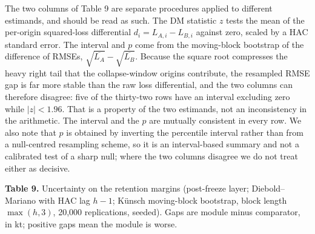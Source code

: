 \documentclass[11pt]{article}
\begin{document}
The two columns of Table 9 are separate procedures applied to different
estimands, and should be read as such. The DM statistic \(z\) tests the
mean of the per-origin squared-loss differential
\(d_i = L_{A,i} - L_{B,i}\) against zero, scaled by a HAC standard error.
The interval and \(p\) come from the moving-block bootstrap of the
difference of RMSEs, \(\sqrt{\overline{L_A}} - \sqrt{\overline{L_B}}\).
Because the square root compresses the heavy right tail that the
collapse-window origins contribute, the resampled RMSE gap is far more
stable than the raw loss differential, and the two columns can therefore
disagree: five of the thirty-two rows have an interval excluding zero
while \(|z| < 1.96\). That is a property of the two estimands, not an
inconsistency in the arithmetic. The interval and the \(p\) are mutually
consistent in every row. We also note that \(p\) is obtained by
inverting the percentile interval rather than from a null-centred
resampling scheme, so it is an interval-based summary and not a
calibrated test of a sharp null; where the two columns disagree we do
not treat either as decisive.

\textbf{Table 9.} Uncertainty on the retention margins (post-freeze
layer; Diebold--Mariano with HAC lag \(h-1\); K\"unsch moving-block
bootstrap, block length \(\max(h,3)\), 20,000 replications, seeded).
Gaps are module minus comparator, in kt; positive gaps mean the module
is worse.
\end{document}
